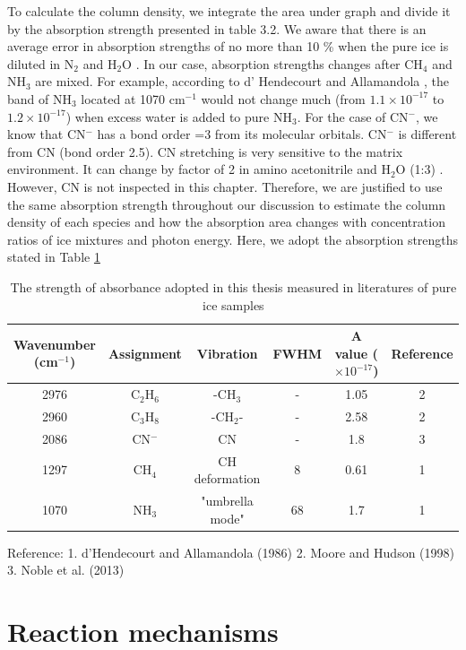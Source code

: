 To calculate the column density, we integrate the area under graph and divide it by the absorption strength presented in table 3.2. We aware that there is an average error in absorption strengths of no more than 10 \%  when the pure ice is diluted in N$_2$ and H$_2$O \cite{richey2012near}. In our case, absorption strengths changes after CH$_4$ and NH$_3$ are mixed. For example, according to d' Hendecourt and Allamandola \cite{d1986time}, the band of NH$_3$ located at 1070 cm$^{-1}$ would not change much (from $1.1 \times 10^{-17}$ to $1.2 \times 10^{-17}$) when excess water is added to pure NH$_3$. For the case of CN$^-$, we know that CN$^-$ has a bond order =3 from its molecular orbitals. CN$^-$ is different from CN (bond order 2.5).  CN stretching is very sensitive to the matrix environment. It can change by factor of 2 in amino acetonitrile and H$_2$O (1:3) \cite{borget2012aminoacetonitrile}. However, CN is not inspected in this chapter. Therefore, we are justified to use the same absorption strength throughout our discussion to estimate the column density of each species and how the absorption area changes with concentration ratios of ice mixtures and photon energy. Here, we adopt the absorption strengths stated in Table \ref{tab:Absorbance} \\

\begin{table}[htbp]
\caption{The strength of absorbance adopted in this thesis measured in literatures of pure ice samples}
\label{tab:Absorbance}
\begin{tabular}{cccccc}
\hline
\hline
Wavenumber (cm$^{-1}$) & Assignment  & Vibration & FWHM & A value ($\times 10^{-17}$) & Reference \\
\hline
2976 &  C$_2$H$_6$ & -CH$_3$ & - & 1.05 & 2 \\
2960 & C$_3$H$_8$ & -CH$_2$- & - & 2.58 & 2 \\
2086 & CN$^-$ & CN & - & 1.8 & 3 \\
1297 & CH$_4$ & CH deformation & 8 & 0.61 & 1 \\
1070 & NH$_3$ & "umbrella mode" & 68 & 1.7 & 1 \\
\hline
\end{tabular}
Reference: 1. d'Hendecourt and Allamandola (1986)\cite{d1986time} 2. Moore and Hudson (1998)\cite{moore1998infrared} 3. Noble et al. (2013) \cite{noble2012thermal}
\end{table}


\section{Reaction mechanisms} %

